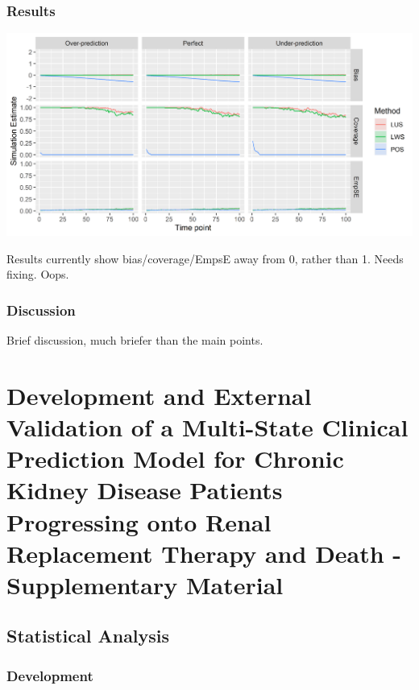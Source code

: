 \documentclass[12pt,PhD,twoside,openright]{muthesis}
\begin{document}
\hypertarget{results-6}{%
\subsection{Results}\label{results-6}}

\includegraphics{figure/IPCW_Logistic/SlopePlot_b(1)_g(0)_e(0.5).png}

Results currently show bias/coverage/EmpsE away from 0, rather than 1. Needs fixing. Oops.

\hypertarget{discussion-5}{%
\subsection{Discussion}\label{discussion-5}}

Brief discussion, much briefer than the main points.

\hypertarget{chap-dev-paper-supp}{%
\chapter{Development and External Validation of a Multi-State Clinical Prediction Model for Chronic Kidney Disease Patients Progressing onto Renal Replacement Therapy and Death - Supplementary Material}\label{chap-dev-paper-supp}}


\hypertarget{statistical-analysis}{%
\section{Statistical Analysis}\label{statistical-analysis}}

\hypertarget{development-1}{%
\subsection{Development}\label{development-1}}
\end{document}
